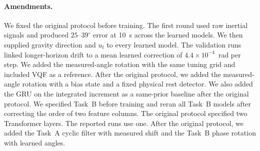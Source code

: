 \paragraph{Amendments.}
We fixed the original protocol before training. The first round used raw
inertial signals and produced $25$--$39^\circ$ error at 10~s across the learned
models. We then supplied gravity direction and $u_t$ to every learned model.
The validation runs linked longer-horizon drift to a mean learned correction
of $4.4\times10^{-4}$~rad per step. We added the measured-angle rotation with
the same tuning grid and included VQF as a reference. After the original
protocol, we added the measured-angle rotation with a bias state and a fixed
physical rest detector. We also added the GRU on the integrated increment as
a same-prior baseline after the original protocol. We specified Task~B before
training and reran all Task~B models after correcting the order of two feature
columns. The original protocol specified two Transformer layers. The reported
runs use one. After the original protocol, we added the Task~A cyclic filter
with measured shift and the Task~B phase rotation with learned angles.

